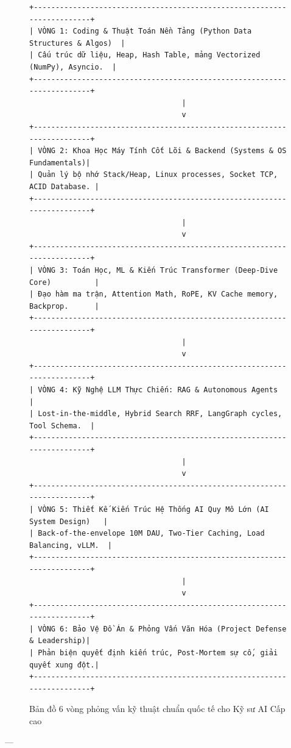 \begin{figure}[htbp]
\centering
\small
\begin{verbatim}
+------------------------------------------------------------------------+
| VÒNG 1: Coding & Thuật Toán Nền Tảng (Python Data Structures & Algos)  |
| Cấu trúc dữ liệu, Heap, Hash Table, mảng Vectorized (NumPy), Asyncio.  |
+------------------------------------------------------------------------+
                                   |
                                   v
+------------------------------------------------------------------------+
| VÒNG 2: Khoa Học Máy Tính Cốt Lõi & Backend (Systems & OS Fundamentals)|
| Quản lý bộ nhớ Stack/Heap, Linux processes, Socket TCP, ACID Database. |
+------------------------------------------------------------------------+
                                   |
                                   v
+------------------------------------------------------------------------+
| VÒNG 3: Toán Học, ML & Kiến Trúc Transformer (Deep-Dive Core)          |
| Đạo hàm ma trận, Attention Math, RoPE, KV Cache memory, Backprop.      |
+------------------------------------------------------------------------+
                                   |
                                   v
+------------------------------------------------------------------------+
| VÒNG 4: Kỹ Nghệ LLM Thực Chiến: RAG & Autonomous Agents                |
| Lost-in-the-middle, Hybrid Search RRF, LangGraph cycles, Tool Schema.  |
+------------------------------------------------------------------------+
                                   |
                                   v
+------------------------------------------------------------------------+
| VÒNG 5: Thiết Kế Kiến Trúc Hệ Thống AI Quy Mô Lớn (AI System Design)   |
| Back-of-the-envelope 10M DAU, Two-Tier Caching, Load Balancing, vLLM.  |
+------------------------------------------------------------------------+
                                   |
                                   v
+------------------------------------------------------------------------+
| VÒNG 6: Bảo Vệ Đồ Án & Phỏng Vấn Văn Hóa (Project Defense & Leadership)|
| Phản biện quyết định kiến trúc, Post-Mortem sự cố, giải quyết xung đột.|
+------------------------------------------------------------------------+
\end{verbatim}
\caption{Bản đồ 6 vòng phỏng vấn kỹ thuật chuẩn quốc tế cho Kỹ sư AI Cấp cao}
\label{fig:interview-map}
\end{figure}

---

